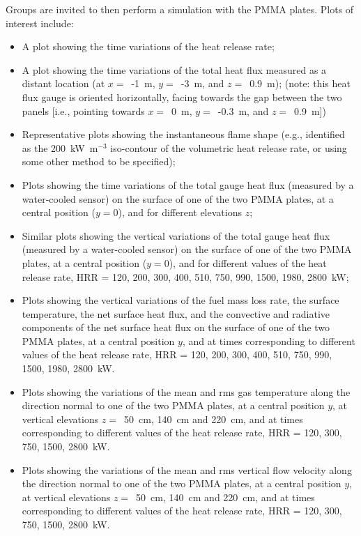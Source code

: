 \documentclass[12pt]{article}
\begin{document}
Groups are invited to then perform a simulation with the PMMA plates. Plots of interest include:
\begin{itemize}[noitemsep]
\item A plot showing the time variations of the heat release rate;
\item A plot showing the time variations of the total heat flux measured as a distant location (at $x =$~-1~m, $y =$~-3~m, and $z =$~0.9~m); (note: this heat flux gauge is oriented horizontally, facing towards the gap between the two panels [i.e., pointing towards $x =$~0~m, $y =$~-0.3~m, and $z =$~0.9~m])
\item Representative plots showing the instantaneous flame shape (e.g., identified as the 200~kW~m$^{-3}$ iso-contour of the volumetric heat release rate, or using some other method to be specified);
\item Plots showing the time variations of the total gauge heat flux (measured by a water-cooled sensor) on the surface of one of the two PMMA plates, at a central position ($y = 0$), and for different elevations $z$;
\item Similar plots showing the vertical variations of the total gauge heat flux (measured by a water-cooled sensor) on the surface of one of the two PMMA plates, at a central position ($y = 0$), and for different values of the heat release rate, HRR = 120, 200, 300, 400, 510, 750, 990, 1500, 1980, 2800~kW;
\item Plots showing the vertical variations of the fuel mass loss rate, the surface temperature, the net surface heat flux, and the convective and radiative components of the net surface heat flux on the surface of one of the two PMMA plates, at a central position $y$, and at times corresponding to different values of the heat release rate, HRR = 120, 200, 300, 400, 510, 750, 990, 1500, 1980, 2800~kW.
\item Plots showing the variations of the mean and rms gas temperature along the direction normal to one of the two PMMA plates, at a central position $y$, at vertical elevations $z =$~50~cm, 140~cm and 220~cm, and at times corresponding to different values of the heat release rate, HRR = 120, 300, 750, 1500, 2800~kW.
\item Plots showing the variations of the mean and rms vertical flow velocity along the direction normal to one of the two PMMA plates, at a central position $y$, at vertical elevations $z =$~50~cm, 140~cm and 220~cm, and at times corresponding to different values of the heat release rate, HRR = 120, 300, 750, 1500, 2800~kW.

\end{itemize}
\end{document}
